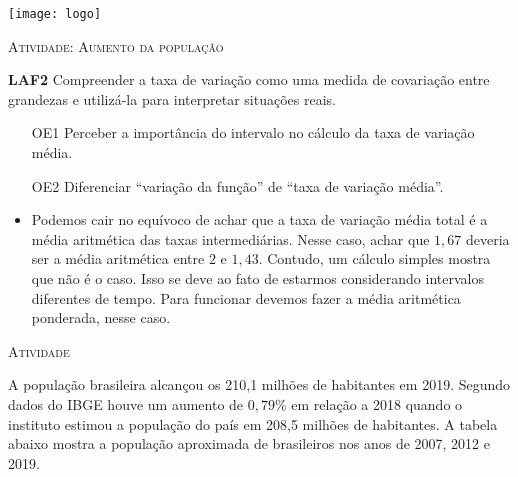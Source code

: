 \documentclass[10 pt,usenames,dvipsnames, oneside]{article}
\begin{document}
\begin{center}
  \begin{minipage}[l]{3cm}
\texttt{[image: logo]}    
\end{minipage}\hfill
\begin{minipage}[r]{.8\textwidth}
 {\Large \scshape Atividade: Aumento da população}  
\end{minipage}
\end{center}
\vspace{.2cm}

\ifdefined\prof
\begin{objetivos}
\item \textbf{LAF2} Compreender a taxa de variação como uma medida de covariação entre grandezas e utilizá-la para interpretar situações reais.
\end{objetivos}

\begin{goals}
\begin{enumerate}

\item [OE1] Perceber a importância do intervalo no cálculo da taxa de variação média.

\item [OE2] Diferenciar “variação da função” de “taxa de variação média”.

\end{enumerate}

\tcblower


\begin{itemize}
\item Podemos cair no equívoco de achar que a taxa de variação média total é a média
aritmética das taxas intermediárias. Nesse caso, achar que $1{,}67$ deveria ser a média
aritmética entre $2$ e $1{,}43$. Contudo, um cálculo simples mostra que não é o caso. Isso se
deve ao fato de estarmos considerando intervalos diferentes de tempo. Para funcionar
devemos fazer a média aritmética ponderada, nesse caso.
\end{itemize}

\end{goals}


\bigskip
\begin{center}
{\large \scshape Atividade}
\end{center}
\fi

A população brasileira alcançou os 210,1 milhões de habitantes em 2019. Segundo dados do IBGE houve um aumento de $0{,}79\%$ em relação a 2018 quando o instituto estimou a população do país em 208,5 milhões de habitantes. A tabela abaixo mostra a população aproximada de brasileiros nos anos de 2007, 2012 e 2019.
\end{document}
